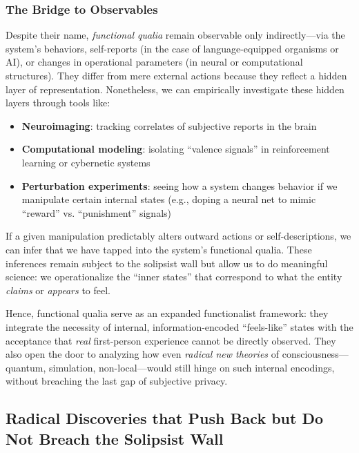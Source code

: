 \documentclass[12pt]{article}
\begin{document}
\subsubsection{The Bridge to Observables}

Despite their name, \textit{functional qualia} remain observable only indirectly---via the system's behaviors, self-reports (in the case of language-equipped organisms or AI), or changes in operational parameters (in neural or computational structures). They differ from mere external actions because they reflect a hidden layer of representation. Nonetheless, we can empirically investigate these hidden layers through tools like:

\begin{itemize}
    \item \textbf{Neuroimaging}: tracking correlates of subjective reports in the brain
    \item \textbf{Computational modeling}: isolating ``valence signals'' in reinforcement learning or cybernetic systems
    \item \textbf{Perturbation experiments}: seeing how a system changes behavior if we manipulate certain internal states (e.g., doping a neural net to mimic ``reward'' vs. ``punishment'' signals)
\end{itemize}

If a given manipulation predictably alters outward actions or self-descriptions, we can infer that we have tapped into the system's functional qualia. These inferences remain subject to the solipsist wall but allow us to do meaningful science: we operationalize the ``inner states'' that correspond to what the entity \textit{claims} or \textit{appears} to feel.

Hence, functional qualia serve as an expanded functionalist framework: they integrate the necessity of internal, information-encoded ``feels-like'' states with the acceptance that \textit{real} first-person experience cannot be directly observed. They also open the door to analyzing how even \textit{radical new theories} of consciousness---quantum, simulation, non-local---would still hinge on such internal encodings, without breaching the last gap of subjective privacy.

\subsection{Radical Discoveries that Push Back but Do Not Breach the Solipsist Wall}
\end{document}
